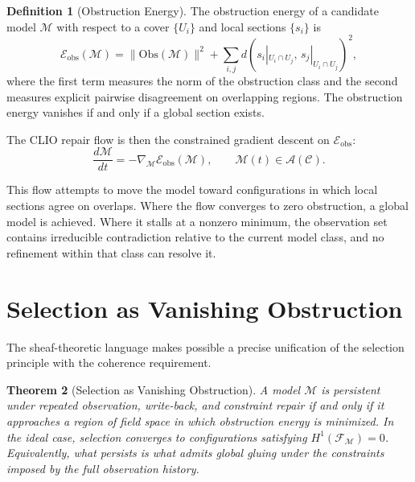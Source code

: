 \documentclass[12pt, a4paper, oneside]{article}
\theoremstyle{plain}
\newtheorem{theorem}{Theorem}[section]
\theoremstyle{definition}
\newtheorem{definition}[theorem]{Definition}
\theoremstyle{remark}
\newcommand{\C}{\mathcal{C}}
\newcommand{\A}{\mathcal{A}}
\begin{document}
\begin{definition}[Obstruction Energy]
\label{def:obstruction-energy}
The obstruction energy of a candidate model $\mathcal{M}$ with respect to a cover $\{U_i\}$ and local sections $\{s_i\}$ is
\begin{equation}
\mathcal{E}_{\mathrm{obs}}(\mathcal{M}) = \|\mathrm{Obs}(\mathcal{M})\|^2 + \sum_{i,j} d\!\left(s_i|_{U_i \cap U_j},\, s_j|_{U_i \cap U_j}\right)^2,
\end{equation}
where the first term measures the norm of the obstruction class and the second measures explicit pairwise disagreement on overlapping regions. The obstruction energy vanishes if and only if a global section exists.
\end{definition}

The CLIO repair flow is then the constrained gradient descent on $\mathcal{E}_{\mathrm{obs}}$:
\begin{equation}
\frac{d\mathcal{M}}{dt} = -\nabla_\mathcal{M} \mathcal{E}_{\mathrm{obs}}(\mathcal{M}), \qquad \mathcal{M}(t) \in \A(\C).
\end{equation}

This flow attempts to move the model toward configurations in which local sections agree on overlaps. Where the flow converges to zero obstruction, a global model is achieved. Where it stalls at a nonzero minimum, the observation set contains irreducible contradiction relative to the current model class, and no refinement within that class can resolve it.

\section{Selection as Vanishing Obstruction}

The sheaf-theoretic language makes possible a precise unification of the selection principle with the coherence requirement.

\begin{theorem}[Selection as Vanishing Obstruction]
\label{thm:selection-obstruction}
A model $\mathcal{M}$ is persistent under repeated observation, write-back, and constraint repair if and only if it approaches a region of field space in which obstruction energy is minimized. In the ideal case, selection converges to configurations satisfying $H^1(\mathcal{F}_\mathcal{M}) = 0$. Equivalently, what persists is what admits global gluing under the constraints imposed by the full observation history.
\end{theorem}
\end{document}
